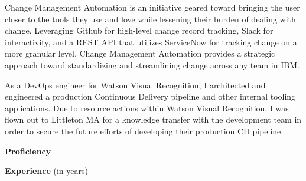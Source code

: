 \documentclass[10pt,a4paper,ragged2e,withhyper]{altacv}
\begin{document}
\begin{paracol}{2}
\medskip


Change Management Automation is an initiative geared toward bringing the user closer to the tools they use and love while lessening their burden of dealing with change. Leveraging Github for high-level change record tracking, Slack for interactivity, and a REST API that utilizes ServiceNow for tracking change on a more granular level, Change Management Automation provides a strategic approach toward standardizing and streamlining change across any team in IBM.

\divider

As a DevOps engineer for Watson Visual Recognition, I architected and engineered a production Continuous Delivery pipeline and other internal tooling applications. Due to resource actions within Watson Visual Recognition, I was flown out to Littleton MA for a knowledge transfer with the development team in order to secure the future efforts of developing their production CD pipeline.

\switchcolumn
\smallskip
{}

\textcolor{accent}{\textbf{Proficiency}}\smallskip








\divider

\textcolor{blueaccent}{\textbf{Experience}} (in years)\smallskip








\end{paracol}
\end{document}
